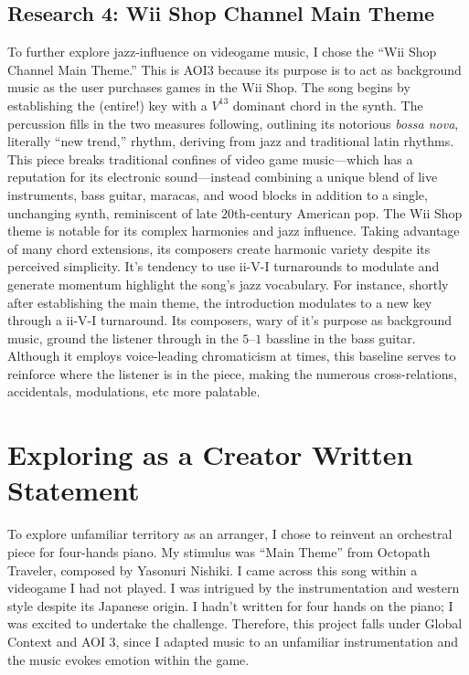 \documentclass[12pt]{article}
\begin{document}
\subsection{Research 4: Wii Shop Channel Main Theme}

To further explore jazz-influence on videogame music, I chose the “Wii Shop Channel Main Theme.” This is AOI3 because its purpose is to act as background music as the user purchases games in the Wii Shop.
    The song begins by establishing the (entire!) key with a $V^{13}$ dominant chord in the synth. The percussion fills in the two measures following, outlining its notorious \textit{bossa nova}, literally “new trend,” rhythm, deriving from jazz and traditional latin rhythms. This piece breaks traditional confines of video game music---which has a reputation for its electronic sound---instead combining a unique blend of live instruments, bass guitar, maracas, and wood blocks in addition to a single, unchanging synth, reminiscent of late 20th-century American pop.
    The Wii Shop theme is notable for its complex harmonies and jazz influence. Taking advantage of many chord extensions, its composers create harmonic variety despite its perceived simplicity. It's tendency to use ii-V-I turnarounds to modulate and generate momentum highlight the song's jazz vocabulary. For instance, shortly after establishing the main theme, the introduction modulates to a new key through a ii-V-I turnaround. Its composers, wary of it's purpose as background music, ground the listener through in the $5–1$ bassline in the bass guitar. Although it employs voice-leading chromaticism at times, this baseline serves to reinforce where the listener is in the piece, making the numerous cross-relations, accidentals, modulations, etc more palatable.\autocite{wiishop}
    
\section{Exploring as a Creator Written Statement}

To explore unfamiliar territory as an arranger, I chose to reinvent an orchestral piece for four-hands piano. My stimulus was “Main Theme” from Octopath Traveler, composed by Yasonuri Nishiki. I came across this song within a videogame I had not played. I was intrigued by the instrumentation and western style despite its Japanese origin. I hadn’t written for four hands on the piano; I was excited to undertake the challenge. Therefore, this project falls under Global Context and AOI 3, since I adapted music to an unfamiliar instrumentation and the music evokes emotion within the game. 
\end{document}
